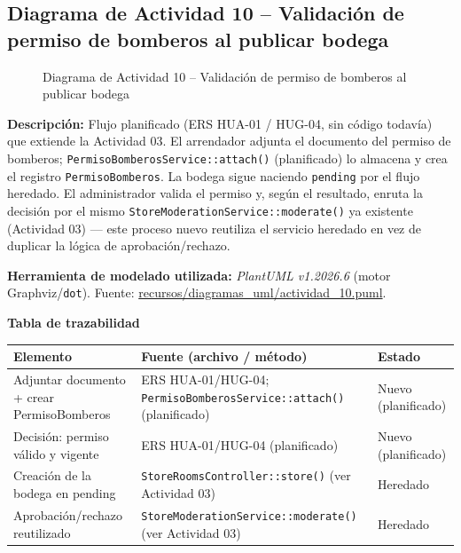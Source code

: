 \subsection{Diagrama de Actividad 10 -- Validación de permiso de bomberos al publicar bodega}
\begin{figure}[H]
    \centering
    \caption{Diagrama de Actividad 10 -- Validación de permiso de bomberos al publicar bodega}
    \label{fig:actividad10}
\end{figure}

{\sloppy\noindent\textbf{Descripción:} Flujo planificado (ERS HUA-01 / HUG-04, sin código todavía) que extiende la Actividad 03. El arrendador adjunta el documento del permiso de bomberos; \texttt{PermisoBomberosService::attach()} (planificado) lo almacena y crea el registro \texttt{PermisoBomberos}. La bodega sigue naciendo \texttt{pending} por el flujo heredado. El administrador valida el permiso y, según el resultado, enruta la decisión por el mismo \texttt{StoreModerationService::moderate()} ya existente (Actividad 03) --- este proceso nuevo reutiliza el servicio heredado en vez de duplicar la lógica de aprobación/rechazo.\par}

\bigskip
{\sloppy\noindent\textbf{Herramienta de modelado utilizada:} \textit{PlantUML v1.2026.6} (motor Graphviz/\texttt{dot}). Fuente: \url{recursos/diagramas_uml/actividad_10.puml}.\par}

\bigskip
\noindent\textbf{Tabla de trazabilidad}
\begin{longtable}{|L{4cm}|L{7.5cm}|M{2.3cm}|}
\hline
{} \textbf{Elemento} & \textbf{Fuente (archivo / método)} & \textbf{Estado} \\ \hline
\endhead
Adjuntar documento + crear PermisoBomberos & ERS HUA-01/HUG-04; \texttt{PermisoBomberosService::attach()} (planificado) & Nuevo (planificado) \\ \hline
Decisión: permiso válido y vigente & ERS HUA-01/HUG-04 (planificado) & Nuevo (planificado) \\ \hline
Creación de la bodega en pending & \texttt{StoreRoomsController::store()} (ver Actividad 03) & Heredado \\ \hline
Aprobación/rechazo reutilizado & \texttt{StoreModerationService::moderate()} (ver Actividad 03) & Heredado \\ \hline
\end{longtable}
\clearpage


